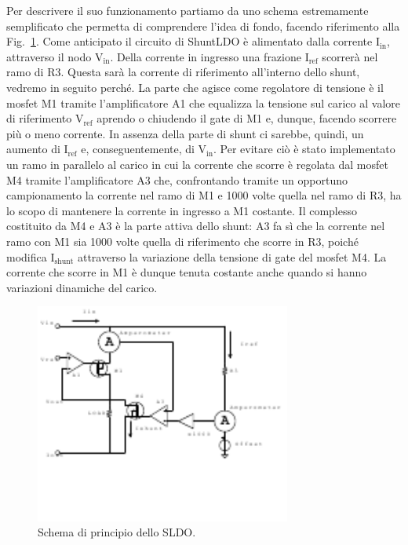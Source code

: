 Per descrivere il suo funzionamento partiamo da uno schema estremamente semplificato che permetta di comprendere l'idea di fondo, facendo riferimento alla Fig.~\ref{SLDOprova}. 
Come anticipato il circuito di ShuntLDO è alimentato dalla corrente $\mathrm{I_{in}}$, attraverso il nodo $\mathrm{V_{in}}$.  Della corrente in ingresso una frazione $\mathrm{I_\mathrm{ref}}$ scorrerà nel ramo di R3. Questa sarà la corrente di riferimento all'interno dello shunt, vedremo in seguito perché. 
La parte che agisce come regolatore di tensione è il mosfet M1 tramite l'amplificatore A1 che equalizza la tensione sul carico al valore di riferimento $\mathrm{V_{ref}}$ aprendo o chiudendo il gate di M1 e, dunque, facendo scorrere più o meno corrente. 
In assenza della parte di shunt ci sarebbe, quindi, un aumento di $\mathrm{I_{ref}}$ e, conseguentemente, di $\mathrm{V_{in}}$. 
Per evitare ciò è stato implementato un ramo in parallelo al carico in cui la corrente che scorre è regolata dal mosfet M4 tramite l'amplificatore A3 che, confrontando tramite un opportuno campionamento la corrente nel ramo di M1 e 1000 volte quella nel ramo di R3, ha lo scopo di mantenere la corrente in ingresso a M1 costante. Il complesso costituito da M4 e A3 è la parte attiva dello shunt: A3 fa sì che la corrente nel ramo con M1 sia 1000 volte quella di riferimento che scorre in R3, poiché modifica $\mathrm{I_{shunt}}$ attraverso la variazione della tensione di gate del mosfet M4. 
La corrente che scorre in M1 è dunque tenuta costante anche quando si hanno variazioni dinamiche del carico.
\begin{figure}[!htbp]
\centering
\includegraphics[width=0.75\textwidth]{Immagini/SLDObase}
\caption{Schema di principio dello SLDO.}
\label{SLDOprova}
\end{figure}
 
